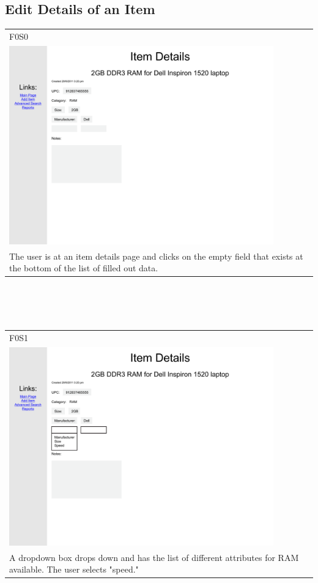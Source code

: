 \documentclass{article}
\begin{document}
\subsection{Edit Details of an Item}
\begin{tabular}{ p{4.5in} }
F0S0\\
\includegraphics[keepaspectratio, width=4.5in]{modifyDetailsF0S0.pdf} \\
The user is at an item details page and clicks on the empty field that exists at the bottom of the list of filled out data.
\end{tabular}\\
~\\
~\\
\begin{tabular}{ p{4.5in} }
F0S1\\
\includegraphics[keepaspectratio, width=4.5in]{modifyDetailsF0S1.pdf} \\
A dropdown box drops down and has the list of different attributes for RAM available. The user selects "speed."
\end{tabular}\\
\end{document}
